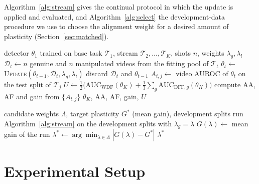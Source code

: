 \documentclass{ieeeaccess}
\begin{document}
Algorithm~\ref{alg:stream} gives the continual protocol in which the update is applied and evaluated, and Algorithm~\ref{alg:select} the development-data procedure we use to choose the alignment weight for a desired amount of plasticity (Section~\ref{sec:matched}).

\begin{algorithm}[t]
\caption{Continual updating and evaluation}
\label{alg:stream}
\footnotesize
\begin{algorithmic}[1]
\Require detector $\theta_1$ trained on base task $\mathcal{T}_1$, stream $\mathcal{T}_2,\dots,\mathcal{T}_K$, shots $n$, weights $\lambda_g,\lambda_l$
  \State $\mathcal{D}_t\gets n$ genuine and $n$ manipulated videos from the fitting pool of $\mathcal{T}_t$
  \State $\theta_t\gets$ \textsc{Update}$(\theta_{t-1},\mathcal{D}_t,\lambda_g,\lambda_l)$ 
  \State discard $\mathcal{D}_t$ and $\theta_{t-1}$ 
    \State $A_{t,j}\gets$ video AUROC of $\theta_t$ on the test split of $\mathcal{T}_j$
  \EndFor
\EndFor
\State $U\gets\frac12\big(\mathrm{AUC}_{\mathrm{WDF}}(\theta_K)+\frac13\sum_g\mathrm{AUC}_{\mathrm{DFF},g}(\theta_K)\big)$ 
\State compute AA, AF and gain from $\{A_{t,j}\}$
\State \Return $\theta_K$, AA, AF, gain, $U$
\end{algorithmic}
\end{algorithm}

\begin{algorithm}[t]
\caption{Development-selected alignment weight}
\label{alg:select}
\footnotesize
\begin{algorithmic}[1]
\Require candidate weights $\Lambda$, target plasticity $G^{*}$ (mean gain), development splits
  \State run Algorithm~\ref{alg:stream} on the development splits with $\lambda_g=\lambda$
  \State $G(\lambda)\gets$ mean gain of the run
\EndFor
\State $\lambda^{*}\gets\arg\min_{\lambda\in\Lambda}|G(\lambda)-G^{*}|$ 
\State \Return $\lambda^{*}$ 
\end{algorithmic}
\end{algorithm}

\section{Experimental Setup}
\label{sec:setup}
\end{document}
